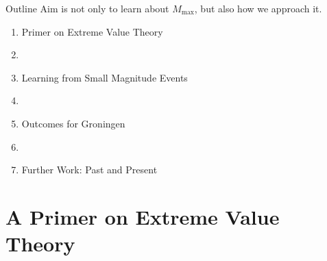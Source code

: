 
\graphicspath{{images/}}
\usepackage{pifont} %
\usepackage{hyperref}


\maketitle

\begin{frame}{Outline}
Aim is not only to learn about $M_{\text{max}}$, but also how we approach it. 

\vspace{2em}

\begin{enumerate}
    \item Primer on Extreme Value Theory 
    \item []
    \item Learning from Small Magnitude Events
    \item []
    \item Outcomes for Groningen 
    \item []
    \item Further Work: Past and Present
\end{enumerate}
\end{frame}

\section{A Primer on Extreme Value Theory}

